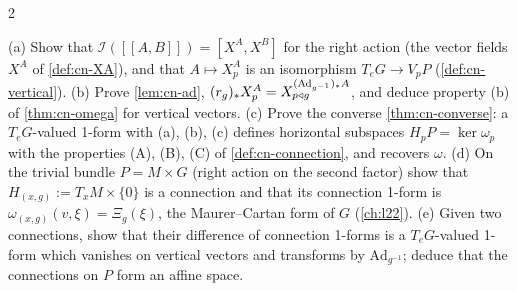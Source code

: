 \begin{paracol}{2}
\begin{exercise}\label{ex:cn-full}
(a) Show that $\mathcal I([\![A,B]\!])=[X^A,X^B]$ for the right action (the vector fields $X^A$ of \cref{def:cn-XA}), and that $A\mapsto X^A_p$ is an isomorphism $T_eG\to V_pP$ (\cref{def:cn-vertical}). (b) Prove \cref{lem:cn-ad}, $(r_g)_*X^A_p=X^{(\mathrm{Ad}_{g^{-1}})_*A}_{p\mathbin{\triangleleft} g}$, and deduce property (b) of \cref{thm:cn-omega} for vertical vectors. (c) Prove the converse \cref{thm:cn-converse}: a $T_eG$-valued 1-form with (a), (b), (c) defines horizontal subspaces $H_pP=\ker\omega_p$ with the properties (A), (B), (C) of \cref{def:cn-connection}, and recovers $\omega$. (d) On the trivial bundle $P=M\times G$ (right action on the second factor) show that $H_{(x,g)}:=T_xM\times\{0\}$ is a connection and that its connection 1-form is $\omega_{(x,g)}(v,\xi)=\Xi_g(\xi)$, the Maurer--Cartan form of $G$ (\cref{ch:l22}). (e) Given two connections, show that their difference of connection 1-forms is a $T_eG$-valued 1-form which vanishes on vertical vectors and transforms by $\mathrm{Ad}_{g^{-1}}$; deduce that the connections on $P$ form an affine space.
\end{exercise}

\flushside
\end{paracol}
